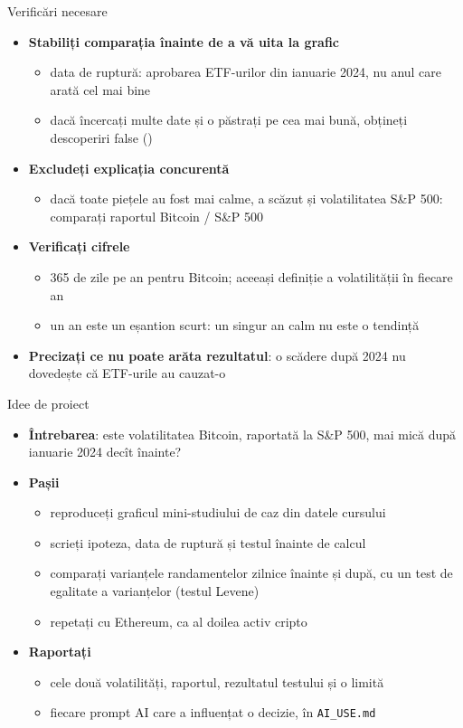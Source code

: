 \begin{frame}{Verificări necesare}
\itemsize{\small}
\begin{itemize}
    \item \textbf{Stabiliți comparația înainte de a vă uita la grafic}
    \begin{itemize}
        \item data de ruptură: aprobarea ETF-urilor din ianuarie 2024, nu anul care arată cel mai bine
        \item dacă încercați multe date și o păstrați pe cea mai bună, obțineți descoperiri false ()
    \end{itemize}
    \item \textbf{Excludeți explicația concurentă}
    \begin{itemize}
        \item dacă toate piețele au fost mai calme, a scăzut și volatilitatea S\&P 500: comparați raportul Bitcoin / S\&P 500
    \end{itemize}
    \item \textbf{Verificați cifrele}
    \begin{itemize}
        \item 365 de zile pe an pentru Bitcoin; aceeași definiție a volatilității în fiecare an
        \item un an este un eșantion scurt: un singur an calm nu este o tendință
    \end{itemize}
    \item \textbf{Precizați ce nu poate arăta rezultatul}: o scădere după 2024 nu dovedește că ETF-urile au cauzat-o
\end{itemize}
\end{frame}

\begin{frame}{Idee de proiect}
\itemsize{\small}
\begin{itemize}
    \item \textbf{Întrebarea}: este volatilitatea Bitcoin, raportată la S\&P 500, mai mică după ianuarie 2024 decît înainte?
    \item \textbf{Pașii}
    \begin{itemize}
        \item reproduceți graficul mini-studiului de caz din datele cursului
        \item scrieți ipoteza, data de ruptură și testul înainte de calcul
        \item comparați varianțele randamentelor zilnice înainte și după, cu un test de egalitate a varianțelor (testul Levene)
        \item repetați cu Ethereum, ca al doilea activ cripto
    \end{itemize}
    \item \textbf{Raportați}
    \begin{itemize}
        \item cele două volatilități, raportul, rezultatul testului și o limită
        \item fiecare prompt AI care a influențat o decizie, în \texttt{AI\_USE.md}
    \end{itemize}
\end{itemize}
\end{frame}


